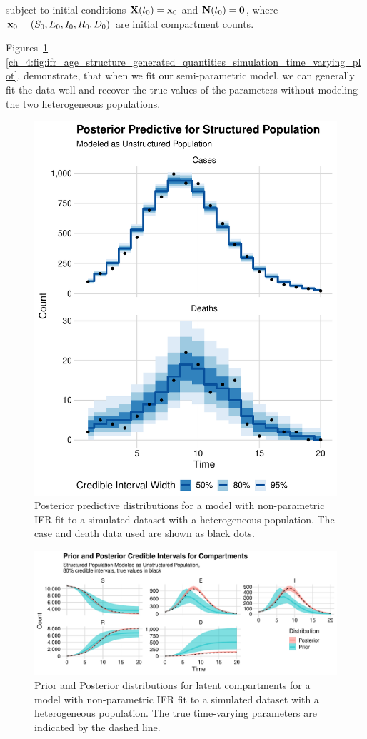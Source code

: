 subject to initial conditions $ \mathbf{X}(t_0) = \mathbf{x}_0 $ and $ \mathbf{N}(t_0) = \mathbf{0}$, where $\mathbf{x}_0 = (S_0, E_0, I_0, R_0, D_0)$ are initial compartment counts.

Figures~\ref{ch_4:fig:posterior_predictive_ifr_age_structure_plot}--\ref{ch_4:fig:ifr_age_structure_generated_quantities_simulation_time_varying_plot}, demonstrate, that when we fit our semi-parametric model, we can generally fit the data well and recover the true values of the parameters without modeling the two heterogeneous populations.

\begin{figure}[htbp]
    \centering
    \includegraphics[width=0.75\columnwidth]{posterior_predictive_ifr_age_structure_plot}
    \caption{Posterior predictive distributions for a model with non-parametric IFR fit to a simulated dataset with a heterogeneous population.
    The case and death data used are shown as black dots.}
    \label{ch_4:fig:posterior_predictive_ifr_age_structure_plot}
\end{figure}

\begin{figure}[htbp]
    \centering
    \includegraphics[width=0.75\columnwidth]{ifr_age_structure_generated_quantities_simulation_compartment_plot}
    \caption{Prior and Posterior distributions for latent compartments for a model with non-parametric IFR fit to a simulated dataset with a heterogeneous population.
    The true time-varying parameters are indicated by the dashed line.}
    \label{ch_4:fig:ifr_age_structure_generated_quantities_simulation_compartment_plot}
\end{figure}


